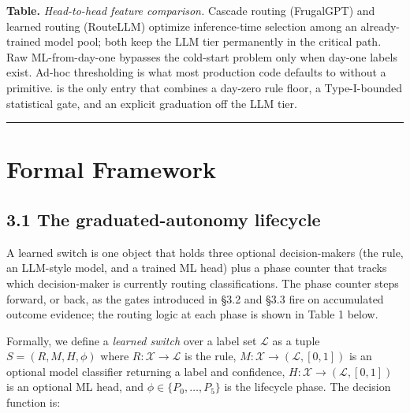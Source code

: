 \textbf{Table.} \emph{Head-to-head feature comparison.} Cascade routing
(FrugalGPT) and learned routing (RouteLLM) optimize inference-time
selection among an already-trained model pool; both keep the LLM tier
permanently in the critical path. Raw ML-from-day-one bypasses the
cold-start problem only when day-one labels exist. Ad-hoc thresholding
is what most production code defaults to without a primitive. \sysname{}
is the only entry that combines a day-zero rule floor, a Type-I-bounded
statistical gate, and an explicit graduation off the LLM tier.

\begin{center}\rule{0.5\linewidth}{0.5pt}\end{center}

\section{Formal Framework}\label{formal-framework}

\subsection{3.1 The graduated-autonomy
lifecycle}\label{the-graduated-autonomy-lifecycle}

A learned switch is one object that holds three optional decision-makers
(the rule, an LLM-style model, and a trained ML head) plus a phase
counter that tracks which decision-maker is currently routing
classifications. The phase counter steps forward, or back, as the gates
introduced in §3.2 and §3.3 fire on accumulated outcome evidence; the
routing logic at each phase is shown in Table 1 below.

Formally, we define a \emph{learned switch} over a label set
\(\mathcal{L}\) as a tuple \(S = (R, M, H, \phi)\) where
\(R: \mathcal{X} \to \mathcal{L}\) is the rule,
\(M: \mathcal{X} \to (\mathcal{L}, [0,1])\) is an optional model
classifier returning a label and confidence,
\(H: \mathcal{X} \to (\mathcal{L}, [0,1])\) is an optional ML head, and
\(\phi \in \{P_0, \ldots, P_5\}\) is the lifecycle phase. The decision
function is:

